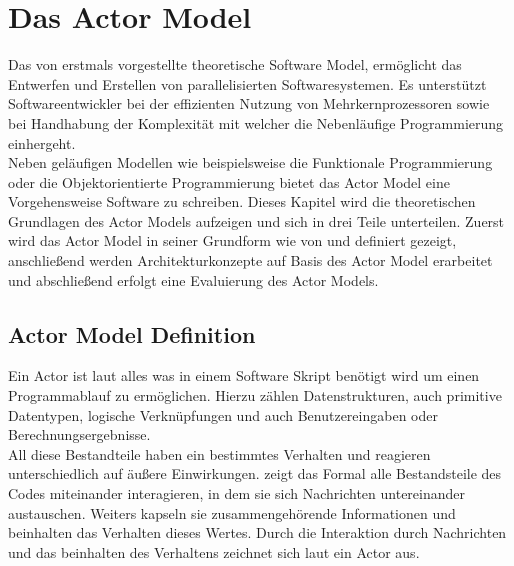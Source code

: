 \chapter{Das Actor Model}
Das von \cite{hewitt1973session} erstmals vorgestellte theoretische Software Model, ermöglicht das Entwerfen und Erstellen von parallelisierten Softwaresystemen. Es unterstützt Softwareentwickler bei der effizienten Nutzung von Mehrkernprozessoren sowie bei Handhabung der  Komplexität mit welcher die Nebenläufige Programmierung einhergeht.   
\\
Neben geläufigen Modellen wie beispielsweise die Funktionale Programmierung oder die Objektorientierte Programmierung bietet das Actor Model eine Vorgehensweise Software zu schreiben. Dieses Kapitel wird die theoretischen Grundlagen des Actor Models aufzeigen und sich in drei Teile unterteilen. Zuerst wird das Actor Model in seiner Grundform wie von \cite{hewitt1973session} und \cite{Agha1985ActorsSystems} definiert gezeigt, anschließend werden Architekturkonzepte auf Basis des Actor Model erarbeitet und abschließend erfolgt eine Evaluierung des Actor Models.

\section{Actor Model Definition}
Ein Actor ist laut \cite{hewitt1973session} alles was in einem Software Skript benötigt wird um einen Programmablauf zu ermöglichen. Hierzu zählen Datenstrukturen, auch primitive Datentypen, logische Verknüpfungen und auch Benutzereingaben oder Berechnungsergebnisse. 
\\
All diese Bestandteile haben ein bestimmtes Verhalten und reagieren unterschiedlich auf äußere Einwirkungen.
\cite{hewitt1973session} zeigt das Formal alle Bestandsteile des Codes miteinander interagieren, in dem sie sich Nachrichten untereinander austauschen.  Weiters kapseln sie zusammengehörende Informationen und beinhalten das Verhalten dieses Wertes. Durch die Interaktion durch Nachrichten und das beinhalten des Verhaltens zeichnet sich laut \cite{hewitt1973session} ein Actor aus.

